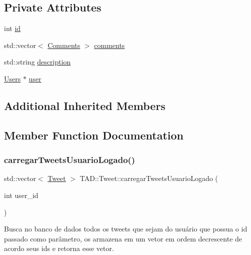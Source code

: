 \subsection*{Private Attributes}
\begin{DoxyCompactItemize}
\item 
int \hyperlink{class_t_a_d_1_1_tweet_a0d651a6534a245a02596f66e799e1d25}{id}
\item 
std\+::vector$<$ \hyperlink{class_t_a_d_1_1_comments}{Comments} $>$ \hyperlink{class_t_a_d_1_1_tweet_a79850077946ffb68a228244aeeb8a3ca}{comments}
\item 
std\+::string \hyperlink{class_t_a_d_1_1_tweet_a54d7321d45fc3aa94e09b45f255d5e39}{description}
\item 
\hyperlink{class_t_a_d_1_1_users}{Users} $\ast$ \hyperlink{class_t_a_d_1_1_tweet_a6dd31e59ddf90b5fe0083f1dbf14104b}{user}
\end{DoxyCompactItemize}
\subsection*{Additional Inherited Members}


\subsection{Member Function Documentation}
\mbox{\label{class_t_a_d_1_1_tweet_a94baf61ace95f86f1da485d35eaee8af}} 
\subsubsection{\texorpdfstring{carregar\+Tweets\+Usuario\+Logado()}{carregarTweetsUsuarioLogado()}}
{\footnotesize\ttfamily std\+::vector$<$ \hyperlink{class_t_a_d_1_1_tweet}{Tweet} $>$ T\+A\+D\+::\+Tweet\+::carregar\+Tweets\+Usuario\+Logado (\begin{DoxyParamCaption}\item[{int}]{user\+\_\+id }\end{DoxyParamCaption})}



Busca no banco de dados todos os tweets que sejam do usuário que possua o id passado como parâmetro, os armazena em um vetor em ordem decrescente de acordo seus id\textquotesingle{}s e retorna esse vetor. 


